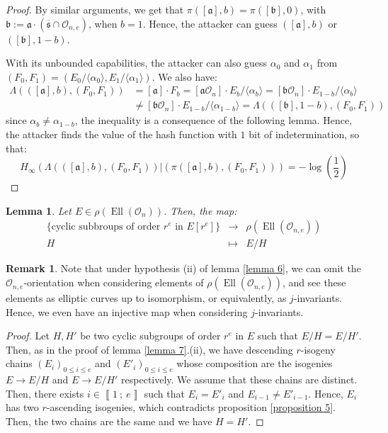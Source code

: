 \documentclass[a4paper,10pt]{report}
\theoremstyle{definition}
\theoremstyle{plain}
\newtheorem{lemma}[definition]{Lemma}
\theoremstyle{definition}
\newtheorem{remark}[definition]{Remark}
\newcommand{\mO}{\mathcal{O}}
\renewcommand{\i}[2]{\left\llbracket #1~;~#2\right\rrbracket}
\renewcommand{\(}{\left(}
\renewcommand{\)}{\right)}
\newcommand{\mf}[1]{\mathfrak{#1}}
\DeclareMathOperator{\Ell}{Ell}
\begin{document}
\begin{proof}
By similar arguments, we get that $\pi([\mf{a}],b)=\pi([\mf{b}],0)$, with $\mf{b}:=\mf{a}\cdot(\overline{\mf{s}}\cap\mO_{n,e})$, when $b=1$. Hence, the attacker can guess $([\mf{a}],b)$ or $([\mf{b}],1-b)$.

With its unbounded capabilities, the attacker can also guess $\alpha_0$ and $\alpha_1$ from $(F_0,F_1)=(E_0/\langle\alpha_0\rangle, E_1/\langle\alpha_1\rangle)$.  We also have:
\begin{align*}\Lambda(([\mf{a}],b),(F_0,F_1))&=[\mf{a}]\cdot F_b=[\mf{a}\mO_n]\cdot E_b/\langle\alpha_b\rangle=[\mf{b}\mO_n]\cdot E_{1-b}/\langle\alpha_b\rangle\\
&\neq [\mf{b}\mO_n]\cdot E_{1-b}/\langle\alpha_{1-b}\rangle=\Lambda(([\mf{b}],1-b),(F_0,F_1))
\end{align*}
since $\alpha_b\neq\alpha_{1-b}$, the inequality is a consequence of the following lemma. Hence, the attacker finds the value of the hash function with $1$ bit of indetermination, so that:
\[H_\infty(\Lambda(([\mf{a}],b),(F_0,F_1))|(\pi([\mf{a}],b),(F_0,F_1)))=-\log\(\frac{1}{2}\)\]
\end{proof}

\begin{lemma}
Let $E\in \rho(\Ell(\mO_n))$. Then, the map:
\[\begin{array}{rcl}
\{\mbox{cyclic subbroups of order } r^e \mbox{ in } E[r^e]\}& \longrightarrow & \rho(\Ell(\mO_{n,e}))\\
H & \longmapsto & E/H 
\end{array}\]
\end{lemma}

\begin{remark}
Note that under hypothesis (ii) of lemma \ref{lemma 6},  we can omit the $\mO_{n,e}$-orientation when considering elements of $\rho(\Ell(\mO_{n,e}))$, and see these elements as elliptic curves up to isomorphism, or equivalently, as $j$-invariants.  Hence, we even have an injective map when considering $j$-invariants.
\end{remark}

\begin{proof}
Let $H, H'$ be two cyclic subgroups of order $r^e$ in $E$ such that $E/H=E/H'$. Then, as in the proof of lemma \ref{lemma 7}.(ii), we have descending $r$-isogeny chains $(E_i)_{0\leq i\leq e}$ and $(E'_i)_{0\leq i\leq e}$ whose composition are the isogenies $E\longrightarrow E/H$ and $E\longrightarrow E/H'$ respectively. We assume that these chains are distinct. Then, there exists $i\in\i{1}{e}$ such that $E_i=E'_i$ and $E_{i-1}\neq E'_{i-1}$. Hence, $E_i$ has two $r$-ascending isogenies, which contradicts proposition \ref{proposition 5}. Then, the two chains are the same and we have $H=H'$.
\end{proof}
\end{document}
